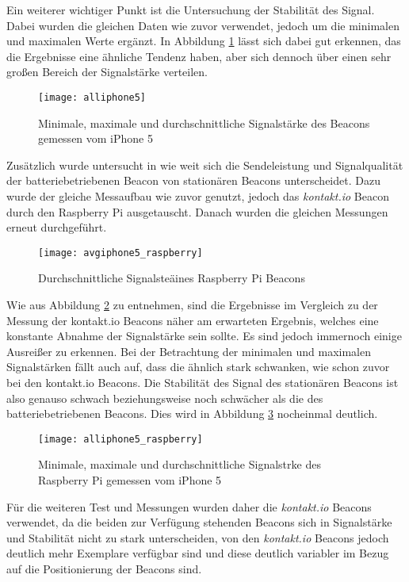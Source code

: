 Ein weiterer wichtiger Punkt ist die Untersuchung der Stabilität des Signal. Dabei wurden die gleichen Daten wie zuvor verwendet, jedoch um die minimalen und maximalen Werte ergänzt. In Abbildung \ref{all-iphone5} lässt sich dabei gut erkennen, das die Ergebnisse eine ähnliche Tendenz haben, aber sich dennoch über einen sehr großen Bereich der Signalstärke verteilen.

\begin{figure}[htb!]
		\centering
	\texttt{[image: alliphone5]}
	\caption{Minimale, maximale und durchschnittliche Signalstärke des Beacons gemessen vom iPhone 5}
	\label{all-iphone5}
\end{figure}


Zusätzlich wurde untersucht in wie weit sich die Sendeleistung und Signalqualität der batteriebetriebenen Beacon von stationären Beacons unterscheidet.
Dazu wurde der gleiche Messaufbau wie zuvor genutzt, jedoch das \emph{kontakt.io} Beacon durch den Raspberry Pi ausgetauscht. Danach wurden die gleichen Messungen erneut durchgeführt.

\begin{figure}[htb!]
		\centering
	\texttt{[image: avgiphone5\_raspberry]}
	\caption{Durchschnittliche Signalsteäines Raspberry Pi Beacons}
		\label{avgiphone5_raspberry}
\end{figure}

Wie aus Abbildung \ref{avgiphone5_raspberry} zu entnehmen, sind die Ergebnisse im Vergleich zu der Messung der kontakt.io Beacons näher am erwarteten Ergebnis, welches eine konstante Abnahme der Signalstärke sein sollte. Es sind jedoch immernoch einige Ausreißer zu erkennen. Bei der Betrachtung der minimalen und maximalen Signalstärken fällt auch auf, dass die ähnlich stark schwanken, wie schon zuvor bei den kontakt.io Beacons. Die Stabilität des Signal des stationären Beacons ist also genauso schwach beziehungsweise noch schwächer als die des batteriebetriebenen Beacons. Dies wird in Abbildung \ref{alliphone5_raspberry} nocheinmal deutlich.

\begin{figure}[htb!]
		\centering
	\texttt{[image: alliphone5\_raspberry]}
	\caption{Minimale, maximale und durchschnittliche Signalstrke des Raspberry Pi gemessen vom iPhone 5}
	\label{alliphone5_raspberry}
\end{figure}

Für die weiteren Test und Messungen wurden daher die \emph{kontakt.io} Beacons verwendet, da die beiden zur Verfügung stehenden Beacons sich in Signalstärke und Stabilität nicht zu stark unterscheiden, von den \emph{kontakt.io} Beacons jedoch deutlich mehr Exemplare verfügbar sind und diese deutlich variabler im Bezug auf die Positionierung der Beacons sind.


